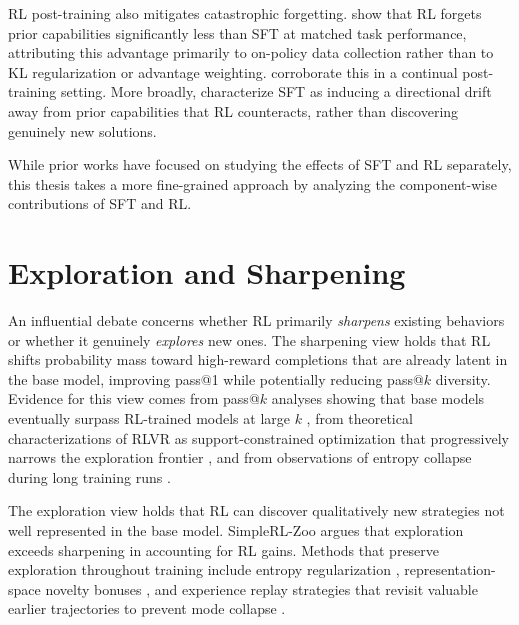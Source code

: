 \documentclass[12pt]{cmuthesis}
\begin{document}
RL post-training also mitigates catastrophic forgetting.
\citet{chenRetainingDoingRole2025} show that RL forgets prior capabilities significantly less than SFT at matched task performance, attributing this advantage primarily to on-policy data collection rather than to KL regularization or advantage weighting.
\citet{laiReinforcementFineTuningNaturally2026} corroborate this in a continual post-training setting.
More broadly, \citet{wuGeneralizationSFTReinforcement2025} characterize SFT as inducing a directional drift away from prior capabilities that RL counteracts, rather than discovering genuinely new solutions.

While prior works have focused on studying the effects of SFT and RL separately, this thesis takes a more fine-grained approach by analyzing the component-wise contributions of SFT and RL.


\section{Exploration and Sharpening}

An influential debate concerns whether RL primarily \emph{sharpens} existing behaviors or whether it genuinely \emph{explores} new ones.
The sharpening view holds that RL shifts probability mass toward high-reward completions that are already latent in the base model, improving pass@1 while potentially reducing pass@$k$ diversity. Evidence for this view comes from pass@$k$ analyses showing that base models eventually surpass RL-trained models at large $k$ \citep{yueDoesReinforcementLearning2025}, from theoretical characterizations of RLVR as support-constrained optimization that progressively narrows the exploration frontier \citep{wuInvisibleLeashWhy2026}, and from observations of entropy collapse during long training runs \citep{zhaoEchoChamberRL2025}.

The exploration view holds that RL can discover qualitatively new strategies not well represented in the base model.
SimpleRL-Zoo \citep{zengSimpleRLZooInvestigatingTaming2025} argues that exploration exceeds sharpening in accounting for RL gains.
Methods that preserve exploration throughout training include entropy regularization \citep{cuiEntropyMechanismReinforcement2025}, representation-space novelty bonuses \citep{tuylsRepresentationBasedExplorationLanguage2025}, and experience replay strategies that revisit valuable earlier trajectories to prevent mode collapse \citep{douImprovingRLExploration2025,zhangRLEPReinforcementLearning2025,zhanExGRPOLearningReason2025}.
\end{document}
